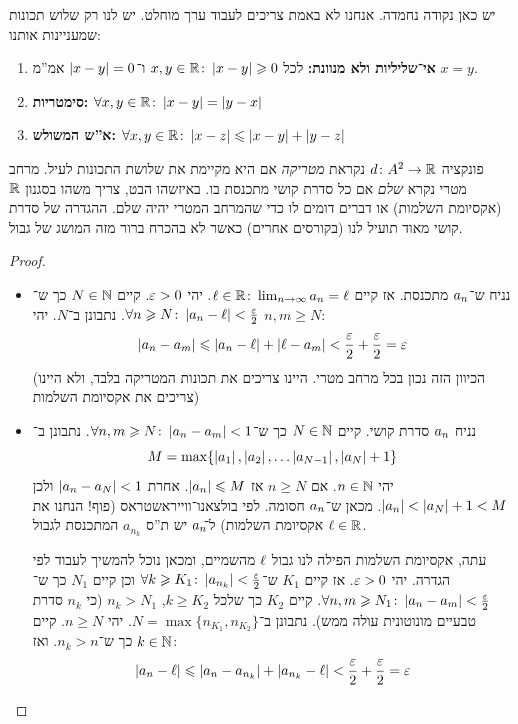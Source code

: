 \documentclass[name=רשימות חשבון דיפרנציאלי ואינטגרלי 1א]{../../../tex/classes/megasumPreamble}
\newcommand\anc     {\an\!\!}
\begin{document}
	יש כאן נקודה נחמדה. אנחנו לא באמת צריכים לעבוד ערך מוחלט. יש לנו רק שלוש תכונות שמעניינות אותנו:
	\begin{enumerate}
		\item \textbf{אי־שליליות ולא מנוונת: }לכל $x, y \in \mathbb{R} \colon \left \lvert x - y \right \rvert \geqslant 0$ ו־$\left \lvert x - y \right \rvert = 0$ אמ''מ $x = y$.
		\item \textbf{סימטריות: }$\forall x, y \in \mathbb{R} \colon \left \lvert x - y \right \rvert = \left \lvert y - x \right \rvert$
		\item \textbf{א''ש המשולש: }$\forall x, y \in \mathbb{R} \colon \left \lvert x - z \right \rvert \leqslant \left \lvert x - y \right \rvert + \left \lvert y - z \right \rvert$
	\end{enumerate}
	פונקציה $d \colon A^2 \to \mathbb{R}$ נקראת \textit{מטריקה} אם היא מקיימת את שלושת התכונות לעיל. מרחב מטרי נקרא \textit{שלם} אם כל סדרת קושי מתכנסת בו. באיזשהו הבט, צריך משהו בסגנון $\mathbb{R}$ (אקסיומת השלמות) או דברים דומים לו כדי שהמרחב המטרי יהיה שלם. ההגדרה של סדרת קושי מאוד תועיל לנו (בקורסים אחרים) כאשר לא בהכרח ברור מזה המושג של גבול.

	\begin{proof}\,
		\begin{itemize}
			\item[$\implies$]נניח ש־$a_n$ מתכנסת. אז קיים $\ell \in \mathbb{R}\colon \lim_{n \to \infty} a_n = \ell$. יהי $\eg > 0$. קיים $N \in \mathbb{N}$ כך ש־$\forall n \ge N \co \sof{a_n - \ml} < \frac{\eg}{2}$. נתבונן ב־$N$. יהי $n, m \ge N$:
			\[ \sof{a_n - a_m} \le \sof{a_n - \ml} + \sof{\ml - a_m} < \frac{\eg}{2} + \frac{\eg}{2} = \eg \]
			(הכיוון הזה נכון בכל מרחב מטרי. היינו צריכים את תכונות המטריקה בלבד, ולא היינו צריכים את אקסיומת השלמות)
			\item[$\impliedby$]נניח $a_n$ סדרת קושי. קיים $N \in \mathbb{N}$ כך ש־$\forall n, m \geqslant N \colon \left \lvert a_n - a_m \right \rvert < 1$. נתבונן ב־
			\[ M = \max\{\left \lvert a_1 \right \rvert, \left \lvert a_2 \right \rvert, \dots \left \lvert a_{N - 1} \right \rvert, \left \lvert a_N \right \rvert + 1\} \]
			יהי $n \in \mathbb{N}$. אם $n \ge N$ אז $\left \lvert a_n \right \rvert \leqslant M$. אחרת $\left \lvert a_n - a_N \right \rvert < 1$ ולכן $\left \lvert a_n \right \rvert < \left \lvert a_N \right \rvert + 1 < M$. מכאן ש־$a_n$ חסומה. לפי בולצאנו־ווייראשטראס (פוף! הנחנו את אקסיומת השלמות) ל־$\anc$ יש ת''ס $a_{n_k}$ המתכנסת לגבול $\ell \in \mathbb{R}$.

			עתה, אקסיומת השלמות הפילה לנו גבול $\ell$ מהשמיים, ומכאן נוכל להמשיך לעבוד לפי הגדרה. יהי $\eg > 0$. אז קיים $K_1$ ש־$\forall k \ge K_1 \co \sof{a_{n_k}} < \frac{\eg}{2}$ וכן קיים $N_1$ כך ש־$\forall n, m \ge N_1 \co \sof{a_n - a_m} < \frac{\eg}{2}$. קיים $K_2$ כך שלכל $k \ge K_2$, $n_k > N_1$ (כי $n_k$ סדרת טבעיים מונוטונית עולה ממש). נתבונן ב־$N = \max\{n_{K_1}, n_{K_2}\}$. יהי $n \ge N$. קיים $k \in \mathbb{N}$ כך ש־$n_k > n$. ואז:
			\[ \sof{a_n - \ml} \le \sof{a_n - a_{n_k}} + \sof{a_{n_k} - \ml} < \frac{\eg}{2} + \frac{\eg}{2} = \eg \]
		\end{itemize}\envendproof
	\end{proof}
	
\end{document}

